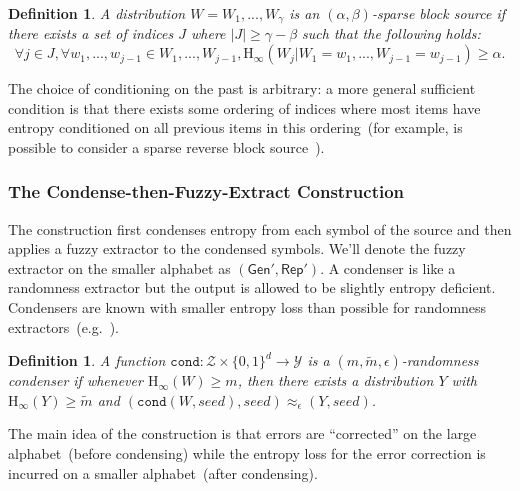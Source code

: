 \documentclass[11pt]{article}
\newtheorem{definition}[theorem]{Definition}
\renewcommand{\paragraph}[1]{\subsubsection{#1}}
\newcommand{\class}[1]{{\ensuremath{\mathsf{#1}}}}
\newcommand{\gen}{\ensuremath{\class{Gen}}\xspace}
\newcommand{\rep}{\ensuremath{\class{Rep}}\xspace}
\newcommand{\zo}{\ensuremath{\{0, 1\}}}
\newcommand{\Hoo}{\mathrm{H}_\infty}
\newcommand{\cond}{\ensuremath{\mathtt{cond}}}
\begin{document}
\begin{definition}
\label{def:partial source}
A distribution $W = W_1,..., W_\gamma$ is an $(\alpha, \beta)$-sparse block source if there exists a set of indices $J$ where $|J| \geq \gamma - \beta$ such that the following holds:
\[
\forall j\in J, \forall w_1,..., w_{j-1} \in W_1,..., W_{j-1}, \Hoo(W_j | W_1 = w_1,..., W_{j-1}=w_{j-1}) \geq \alpha.
\]
\end{definition}
The choice of conditioning on the past is arbitrary: a more general sufficient condition is that there exists some ordering of indices where most items have entropy conditioned on all previous items in this ordering~(for example, is possible to consider a sparse reverse block source~\cite{vadhan2003constructing}).  

\paragraph{The Condense-then-Fuzzy-Extract Construction}
The construction first condenses entropy from each symbol of the source and then applies a fuzzy extractor to the condensed symbols. We'll denote the fuzzy extractor on the smaller alphabet as $(\gen', \rep')$.  A condenser is like a randomness extractor but the output is allowed to be slightly entropy deficient.  Condensers are known with smaller entropy loss than possible for randomness extractors~(e.g.~\cite{dodis2014key}).
\begin{definition}
\label{def:conductor}
A function $\cond : \mathcal{Z}\times \zo^d\rightarrow \mathcal{Y}$ is a $(m, \tilde{m}, \epsilon)$-randomness condenser if whenever $\Hoo(W)\ge m$, then there exists a distribution $Y$ with $\Hoo(Y)\ge \tilde{m}$ and $(\cond(W, seed), seed) \approx_\epsilon (Y, seed)$.
\end{definition}

The main idea of the construction is that errors are ``corrected'' on the large alphabet~(before condensing) while the entropy loss for the error correction is incurred on a smaller alphabet~(after condensing).
\end{document}
